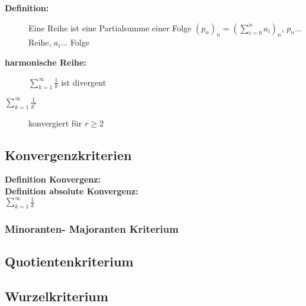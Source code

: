 \begin{description}
    \item[\textbf{Definition:}] Eine Reihe ist eine Partialsumme einer Folge $(p_n)_n = \left(\sum\limits_{i=0}^{n}a_i \right)_n$, $p_n$... Reihe, $a_i$... Folge\\
    \item[\textbf{harmonische Reihe:}] $\sum\limits_{k=1}^{\infty}\frac{1}{k}$ ist divergent\\
    \item[$\sum\limits_{k=1}^{\infty}\frac{1}{k^r}$] konvergiert für $r\geq 2$\\
\end{description}




\subsection{Konvergenzkriterien}

\textbf{Definition Konvergenz:} \\

\textbf{Definition absolute Konvergenz:} \\$\sum\limits_{k=1}^{\infty}\frac{1}{k}$ 

\subsubsection{Minoranten- Majoranten Kriterium}

\subsection{Quotientenkriterium}

\subsection{Wurzelkriterium}